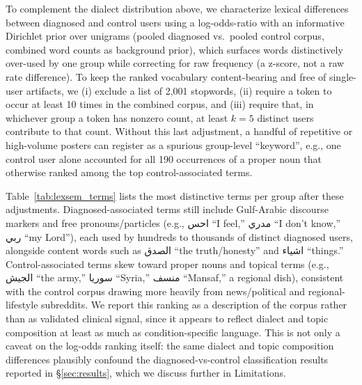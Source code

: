 \documentclass[11pt]{article}
\begin{document}
To complement the dialect distribution above, we characterize lexical differences between diagnosed and control users using a log-odds-ratio with an informative Dirichlet prior \citep{monroe-etal-2008-fightin} over unigrams (pooled diagnosed vs.\ pooled control corpus, combined word counts as background prior), which surfaces words distinctively over-used by one group while correcting for raw frequency (a z-score, not a raw rate difference).
To keep the ranked vocabulary content-bearing and free of single-user artifacts,
we (i) exclude a list of 2,001 stopwords, (ii) require a token to occur at least 10 times in the combined corpus, and 
(iii) require that, in whichever group a token has nonzero count, at least $k{=}5$ distinct users contribute to that count. 
Without this last adjustment, a handful of repetitive or high-volume posters can register as a spurious group-level 
``keyword'', e.g., one control user alone accounted for all 190 occurrences of a proper noun that otherwise ranked 
among the top control-associated terms.

Table~\ref{tab:lexsem_terms} lists the most distinctive terms per group after these adjustments. Diagnosed-associated terms still include Gulf-Arabic discourse markers and free pronouns/particles (e.g., \foreignlanguage{arabic}{احس} ``I feel,'' \foreignlanguage{arabic}{مدري} ``I don't know,'' \foreignlanguage{arabic}{ربي} ``my Lord''), each used by hundreds to thousands of distinct diagnosed users, alongside content words such as \foreignlanguage{arabic}{الصدق} ``the truth/honesty'' and \foreignlanguage{arabic}{اشياء} ``things.'' Control-associated terms skew toward proper nouns and topical terms (e.g., \foreignlanguage{arabic}{الجيش} ``the army,'' \foreignlanguage{arabic}{سوريا} ``Syria,'' \foreignlanguage{arabic}{منسف} ``Mansaf,'' a regional dish), consistent with the control corpus drawing more heavily from news/political and regional-lifestyle subreddits. We report this ranking as a description of the corpus rather than as validated clinical signal, since it appears to reflect dialect and topic composition at least as much as condition-specific language. This is not only a caveat on the log-odds ranking itself: the same dialect and topic composition differences plausibly confound the diagnosed-vs-control classification results reported in §\ref{sec:results}, which we discuss further in Limitations.
\end{document}
